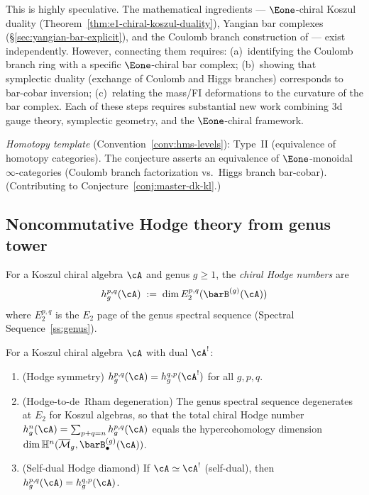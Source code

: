 \begin{remark}[Scope]\label{rem:3d-mirror-scope}
This is highly speculative.  The mathematical ingredients ---
$\Eone$-chiral Koszul duality
(Theorem~\ref{thm:e1-chiral-koszul-duality}), Yangian bar
complexes (\S\ref{sec:yangian-bar-explicit}), and the
Coulomb branch construction of \cite{BFN18} --- exist
independently.  However, connecting them requires: (a)~identifying
the Coulomb branch ring with a specific $\Eone$-chiral bar
complex; (b)~showing that symplectic duality (exchange of Coulomb
and Higgs branches) corresponds to bar-cobar inversion; (c)~relating
the mass/FI deformations to the curvature of the bar complex.
Each of these steps requires substantial new work combining
3d gauge theory, symplectic geometry, and the $\Eone$-chiral
framework.

\emph{Homotopy template} (Convention~\ref{conv:hms-levels}): Type~II (equivalence of homotopy categories).
The conjecture asserts an equivalence of $\Eone$-monoidal $\infty$-categories
(Coulomb branch factorization vs.\ Higgs branch bar-cobar).
(Contributing to Conjecture~\ref{conj:master-dk-kl}.)
\end{remark}

\subsection{Noncommutative Hodge theory from genus tower}
\label{subsec:nc-hodge}

\begin{definition}\label{def:chiral-hodge-numbers}
For a Koszul chiral algebra $\cA$ and genus $g \geq 1$, the
\emph{chiral Hodge numbers} are
\[
h^{p,q}_g(\cA)
\;:=\;
\dim E_2^{p,q}(\barB^{(g)}(\cA))
\]
where $E_2^{p,q}$ is the $E_2$ page of the genus spectral
sequence (Spectral Sequence~\ref{ss:genus}).
\end{definition}

\begin{proposition}\label{prop:nc-hodge-symmetry}
For a Koszul chiral algebra $\cA$ with dual $\cA^!$:
\begin{enumerate}[label=\textup{(\roman*)}]
\item \textup{(Hodge symmetry)}
  $h^{p,q}_g(\cA) = h^{q,p}_g(\cA^!)$ for all $g, p, q$.
\item \textup{(Hodge-to-de~Rham degeneration)}
  The genus spectral sequence degenerates at $E_2$
  for Koszul algebras, so that the total chiral Hodge number
  $h^n_g(\cA) = \sum_{p+q=n} h^{p,q}_g(\cA)$
  equals the hypercohomology dimension
  $\dim \mathbb{H}^n(\overline{\mathcal{M}}_g,
  \barB^{(g)}_\bullet(\cA))$.
\item \textup{(Self-dual Hodge diamond)}
  If $\cA \simeq \cA^!$ \textup{(}self-dual\textup{)},
  then $h^{p,q}_g(\cA) = h^{q,p}_g(\cA)$.
\end{enumerate}
\end{proposition}

